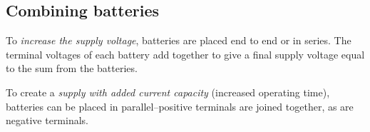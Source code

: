 \documentclass[../../document]{subfiles}
\begin{document}
\subsection{Combining batteries}
To \emph{increase the supply voltage}, batteries are
placed end to end or in series. The terminal voltages of each battery add together
to give a final supply voltage equal to the sum from the batteries. \cite[p. 67]{practical_electronics}

To create a \emph{supply with added current capacity} (increased operating time),
batteries can be placed in parallel--positive terminals are joined together, as
are negative terminals. \cite{practical_electronics}
\end{document}
